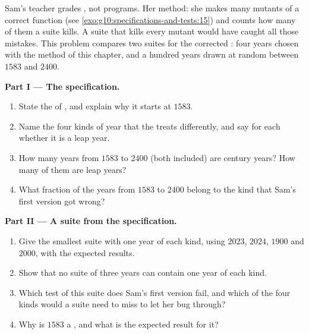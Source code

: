 \begin{problem}\label{pb:g10:specifications-and-tests:1}
Sam's teacher grades , not programs. Her method: she makes many mutants of a correct function (see
\cref{exo:g10:specifications-and-tests:15}) and counts how many of them a suite kills. A suite that kills every mutant
would have caught all those mistakes. This problem compares two suites for the corrected : four
years chosen with the method of this chapter, and a hundred years drawn at random between $1583$ and $2400$.

\medskip\noindent\textbf{Part I --- The specification.}
\begin{enumerate}
  \item State the  of , and explain why it starts at $1583$.
  \item Name the four kinds of year that the  treats differently, and say for each whether it is a
    leap year.
  \item How many years from $1583$ to $2400$ (both included) are century years? How many of them are leap years?
  \item What fraction of the years from $1583$ to $2400$ belong to the kind that Sam's first version got wrong?
\end{enumerate}

\medskip\noindent\textbf{Part II --- A suite from the specification.}
\begin{enumerate}[resume]
  \item Give the smallest suite with one year of each kind, using $2023$, $2024$, $1900$ and $2000$, with the
    expected results.
  \item Show that no suite of three years can contain one year of each kind.
  \item Which test of this suite does Sam's first version fail, and which of the four kinds would a suite need to
    miss to let her bug through?
  \item Why is $1583$ a , and what is the expected result for it?
\end{enumerate}


\end{problem}
